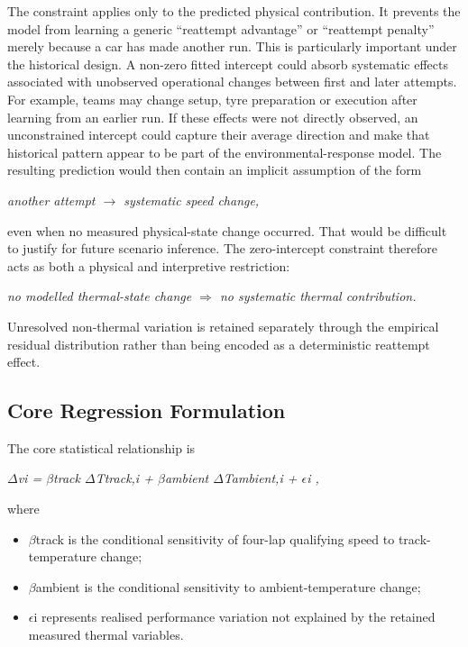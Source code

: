 The constraint applies only to the predicted physical contribution. It prevents the model from learning a generic ``reattempt advantage'' or ``reattempt penalty'' merely because a car has made another run. This is particularly important under the historical design. A non-zero fitted intercept could absorb systematic effects associated with unobserved operational changes between first and later attempts. For example, teams may change setup, tyre preparation or execution after learning from an earlier run. If these effects were not directly observed, an unconstrained intercept could capture their average direction and make that historical pattern appear to be part of the environmental-response model. The resulting prediction would then contain an implicit assumption of the form

\begin{center}\textit{another attempt \ensuremath{\rightarrow} systematic speed change,}\end{center}

even when no measured physical-state change occurred. That would be difficult to justify for future scenario inference. The zero-intercept constraint therefore acts as both a physical and interpretive restriction:

\begin{center}\textit{no modelled thermal-state change \ensuremath{\Rightarrow} no systematic thermal contribution.}\end{center}

Unresolved non-thermal variation is retained separately through the empirical residual distribution rather than being encoded as a deterministic reattempt effect.

\subsection{Core Regression Formulation}
The core statistical relationship is

\begin{center}\textit{\ensuremath{\Delta}vi = \ensuremath{\beta}track \ensuremath{\Delta}Ttrack,i + \ensuremath{\beta}ambient \ensuremath{\Delta}Tambient,i + \ensuremath{\epsilon}i ,}\end{center}

where

\begin{itemize}
\item \ensuremath{\beta}track is the conditional sensitivity of four-lap qualifying speed to track-temperature change;
\item \ensuremath{\beta}ambient is the conditional sensitivity to ambient-temperature change;
\item \ensuremath{\epsilon}i represents realised performance variation not explained by the retained measured thermal variables.
\end{itemize}

